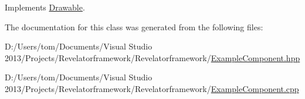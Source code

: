 Implements \hyperlink{class_drawable_a0e24de52eeb44555872c70f3adf854d2}{Drawable}.



The documentation for this class was generated from the following files\-:\begin{DoxyCompactItemize}
\item 
D\-:/\-Users/tom/\-Documents/\-Visual Studio 2013/\-Projects/\-Revelatorframework/\-Revelatorframework/\hyperlink{_example_component_8hpp}{Example\-Component.\-hpp}\item 
D\-:/\-Users/tom/\-Documents/\-Visual Studio 2013/\-Projects/\-Revelatorframework/\-Revelatorframework/\hyperlink{_example_component_8cpp}{Example\-Component.\-cpp}\end{DoxyCompactItemize}
